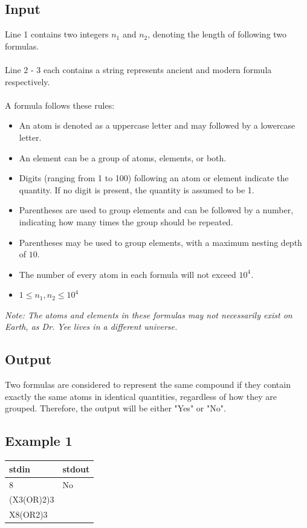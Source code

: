 \documentclass[12pt,a4paper]{article}
\begin{document}
\subsection*{\fontsize{16}{12}Input}
Line 1 contains two integers $n_1$ and $n_2$, denoting the length of following two formulas.
\\\\
\noindent
Line 2 - 3 each contains a string represents ancient and modern formula respectively.\\\\
\noindent
A formula follows these rules:  
\begin{itemize}
    \item An atom is denoted as a uppercase letter and may followed by a lowercase letter. 
    \item An element can be a group of atoms, elements, or both.
    \item Digits (ranging from 1 to 100) following an atom or element indicate the quantity. If no digit is present, the quantity is assumed to be 1.  
    \item Parentheses are used to group elements and can be followed by a number, indicating how many times the group should be repeated.
    \item Parentheses may be used to group elements, with a maximum nesting depth of \( 10 \).
    \item The number of every atom in each formula will not exceed \(10^4\).
    \item $1 \leq n_1, n_2 \leq 10^4$
\end{itemize}  
\noindent
\textit{Note: The atoms and elements in these formulas may not necessarily exist on Earth, as Dr. Yee lives in a different universe.}  


\subsection*{\fontsize{16}{12}Output}
Two formulas are considered to represent the same compound if they contain exactly the same atoms in identical quantities, regardless of how they are grouped. Therefore, the output will be either "Yes" or "No".

\subsection*{\fontsize{16}{12}Example 1}
\begin{table}[h]
  \centering
  \begin{tabularx}{\textwidth}{|>{\ttfamily}X|>{\ttfamily}X|}
    \hline
    stdin & stdout \\
    \hline
    10 8 & No \\
    (X3(OR)2)3 & \\
    X8(OR2)3 &  \\
    \hline
  \end{tabularx}
\end{table}
\end{document}
